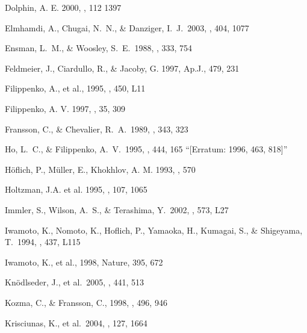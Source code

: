 Dolphin, A. E. 2000, \pasp, 112 1397

 Elmhamdi, A., Chugai, 
N.~N., \& Danziger, I.~J.\ 2003, \aap, 404, 1077

 Ensman, L.~M., \& Woosley, S.~E.\ 1988, \apj, 333, 754 

 Feldmeier, J., Ciardullo, R., \& Jacoby, G. 1997, Ap.J., 479, 231

 Filippenko, A., et al., 1995, \apjl, 450, L11

 Filippenko, A. V. 1997, \araa, 35, 309

 Fransson, C., \& 
Chevalier, R.~A.\ 1989, \apj, 343, 323 


 
 Ho, L.~C., \& 
Filippenko, A.~V.\ 1995, \apj, 444, 165 ``[Erratum: 1996, 463, 818]''
 

 H\"{o}flich, P., M\"{u}ller, E., Khokhlov, A. M. 1993,
, 570

 Holtzman, J.A. et al. 1995, \pasp, 107, 1065
 
 Immler, S., Wilson, 
A.~S., \& Terashima, Y.\ 2002, \apjl, 573, L27 
 
 Iwamoto, K., Nomoto, 
K., Hoflich, P., Yamaoka, H., Kumagai, S., \& Shigeyama, T.\ 1994, \apjl, 437, L115 
 
 Iwamoto, K., et al., 1998, Nature, 395, 672

 Kn{\"o}dlseder, 
J., et al.\ 2005, \aap, 441, 513 

 Kozma, C., \& Fransson, C., 1998, \apj, 496, 946
 
 Krisciunas, K., et al.\ 2004, \aj, 127, 1664 

